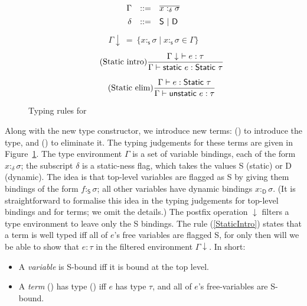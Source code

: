 \documentclass{sigplanconf}
\begin{document}
\begin{figure}[t!]
\begin{minipage}{\linewidth}
$$
\begin{array}{rcl}
\Gamma & ::= & \overline{x :_{\delta} \sigma} \\[1ex]
     \delta & ::= & \mbox{{\sf S}} ~|~ \mbox{{\sf D}}
\end{array}
$$
\begin{align*}
\Gamma\downarrow ~=~ \{ x:_{\textsf{s}} \sigma \mid x :_{\textsf{s}} \sigma \in \Gamma \}
\end{align*}
\begin{equation*}
\tag{Static~intro}\label{StaticIntro}
\frac{\Gamma\downarrow~\vdash e : \tau}
     {\Gamma \vdash \textsf{static}~e : \textsf{Static}~\tau}
\end{equation*}

\begin{equation*}
\tag{Static~elim}\label{StaticElim}
\frac{\Gamma \vdash e : \textsf{Static}~\tau}
     {\Gamma \vdash \textsf{unstatic}~e : \tau}
\end{equation*}
\end{minipage}
\caption{Typing rules for } \label{fig:static}
\end{figure}
Along with the new type constructor, we introduce new terms:
($\!$) to introduce the type, and 
($\!$) to eliminate it.
The typing judgements for these terms are given in Figure~\ref{fig:static}.
The type environment $\Gamma$ is a set of variable bindings, each of the form $x :_{\delta} \sigma$;
the subscript $\delta$ is a static-ness flag, which takes the values \textsf{S} (static) or
\textsf{D} (dynamic).  The idea is that top-level variables are flagged as \textsf{S} by giving them bindings
of the form $f\! :_{\textsf{S}}\! \sigma$; all other variables have dynamic bindings 
$x\! :_{\textsf{D}}\!\sigma$.
(It is straightforward to formalise this idea in the typing judgements for top-level
bindings and for terms; we omit the details.)
The postfix operation $\downarrow$ filters a type environment
to leave only the
\textsf{S} bindings.
The rule (\ref{StaticIntro}) states that a term  is well typed iff all of $e$'s free variables are flagged \textsf{S}, for only then will we be able to show that $e : \tau$ in the filtered environment $\Gamma \downarrow$.  In short:
\begin{itemize}
\item A \emph{variable} is \textsf{S}-bound iff it is bound at the top level.
\item A \emph{term} ($\!$) has type ($\!$) iff 
$e$ has type $\tau$, and all of $e$'s free-variables are \textsf{S}-bound.  
\end{itemize}
\end{document}
